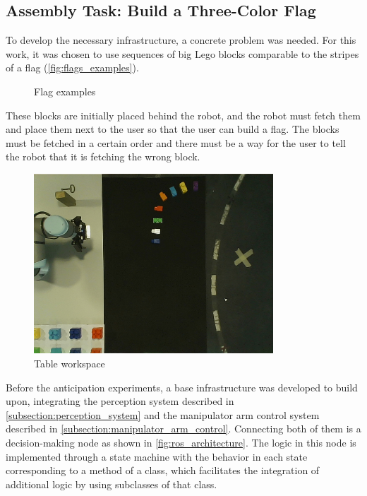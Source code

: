 \subsection{Assembly Task: Build a Three-Color Flag}

To develop the necessary infrastructure, a concrete problem was needed. For this work, it was chosen to use sequences of big Lego blocks comparable to the stripes of a flag (\autoref{fig:flags_examples}).

\begin{figure}[ht]
    \centering
    
    \caption{Flag examples}
    \label{fig:flags_examples}
\end{figure}

These blocks are initially placed behind the robot, and the robot must fetch them and place them next to the user so that the user can build a flag. The blocks must be fetched in a certain order and there must be a way for the user to tell the robot that it is fetching the wrong block.

\begin{figure}[ht]
    \centerline{\includegraphics[width=0.8\textwidth]{figs/table_workspace.jpg}}
    \caption{Table workspace}
    \label{fig:table_workspace}
\end{figure}

Before the anticipation experiments, a base infrastructure was developed to build upon, integrating the perception system described in \autoref{subsection:perception_system} and the manipulator arm control system described in \autoref{subsection:manipulator_arm_control}. Connecting both of them is a decision-making node as shown in \autoref{fig:ros_architecture}. The logic in this node is implemented through a state machine with the behavior in each state corresponding to a method of a class, which facilitates the integration of additional logic by using subclasses of that class.

